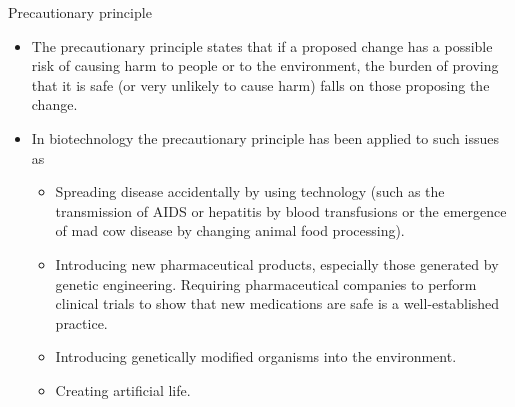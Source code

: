 \documentclass[ignorenonframetext,aspectratio=169]{beamer}
\providecommand{\tightlist}{%
  \setlength{\itemsep}{0pt}\setlength{\parskip}{0pt}}
\begin{document}
\begin{frame}{Precautionary principle}
\protect\hypertarget{precautionary-principle}{}

\begin{itemize}
\tightlist
\item
  The precautionary principle states that if a proposed change has a
  possible risk of causing harm to people or to the environment, the
  burden of proving that it is safe (or very unlikely to cause harm)
  falls on those proposing the change.
\item
  In biotechnology the precautionary principle has been applied to such
  issues as

  \begin{itemize}
  \tightlist
  \item
    Spreading disease accidentally by using technology (such as the
    transmission of AIDS or hepatitis by blood transfusions or the
    emergence of mad cow disease by changing animal food processing).
  \item
    Introducing new pharmaceutical products, especially those generated
    by genetic engineering. Requiring pharmaceutical companies to
    perform clinical trials to show that new medications are safe is a
    well-established practice.
  \item
    Introducing genetically modified organisms into the environment.
  \item
    Creating artificial life.
  \end{itemize}
\end{itemize}

\end{frame}
\end{document}
